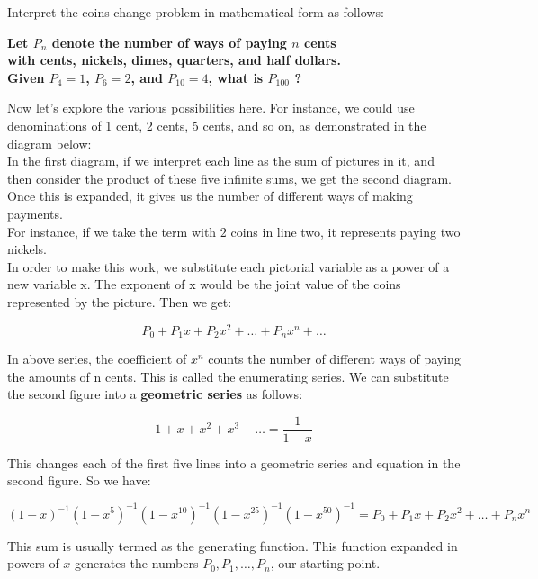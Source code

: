 \documentclass{article}
\theoremstyle{definition}
\theoremstyle{question}
\begin{document}
    \newpage
    \noindent Interpret the coins change problem in mathematical form as follows: \\
    
    \noindent 
    \begin{center}\textbf{\noindent Let \( P_n \) denote the number of ways of paying \( n \) cents \\ with cents, nickels, dimes, quarters, and half dollars.\\ Given \(P_4=1\), \(P_6=2\), and \(P_{10}=4\), what is \(P_{100}\) ?}
    \end{center}
    
    \noindent Now let's explore the various possibilities here. For instance, we could use denominations of 1 cent, 2 cents, 5 cents, and so on, as demonstrated in the diagram below: \\
    
    \noindent In the first diagram, if we interpret each line as the sum of pictures in it, and then consider the product of these five infinite sums, we get the second diagram. Once this is expanded, it gives us the number of different ways of making payments. \\
    
    \noindent For instance, if we take the term with \(2\) coins in line two, it represents paying two nickels. \\
    
    \noindent In order to make this work, we substitute each pictorial variable as a power of a new variable x. The exponent of x would be the joint value of the coins represented by the  picture. Then we get:
    
    \[
    P_0 + P_1 x + P_2 x^2 + \dots + P_n x^n + \dots
    \]
    
    \noindent In above series, the coefficient of \(x^n\) counts the number of different ways of paying the amounts of n cents. This is called the enumerating series. We can substitute the second figure into a \textbf{geometric series} as follows:
    
    \[
    1 + x + x^2 + x^3 + \dots = \frac{1}{1-x}
    \]
    
    \noindent This changes each of the first five lines into a geometric series and equation in the second figure. So we have:
    
    \[
    (1 - x)^{-1}(1 - x^5)^{-1}(1 - x^{10})^{-1}(1 - x^{25})^{-1}(1 - x^{50})^{-1} = P_0 + P_1 x + P_2 x^2 + \dots + P_n x^n
    \]
    
    \noindent This sum is usually termed as the generating function. This function expanded in powers of \(x\) generates the numbers \(P_0, P_1, \dots, P_n\), our starting point. \\
    
\end{document}
